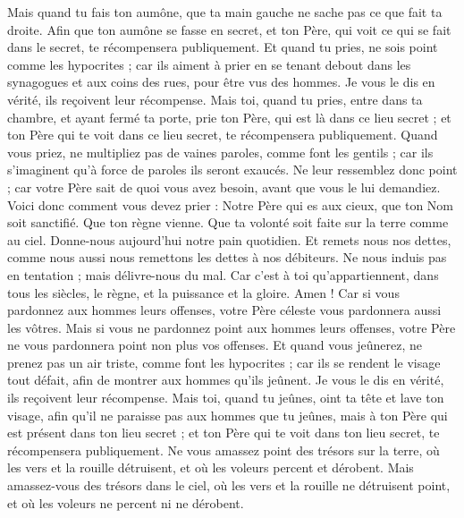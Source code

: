\begin{multicols}{2}
Mais quand tu fais ton aumône, que ta main gauche ne sache pas ce que fait ta droite.
Afin que ton aumône se fasse en secret, et ton Père, qui voit ce qui se fait dans le secret, te récompensera publiquement.
Et quand tu pries, ne sois point comme les hypocrites ; car ils aiment à prier en se tenant debout dans les synagogues et aux coins des rues, pour être vus des hommes. Je vous le dis en vérité, ils reçoivent leur récompense.
Mais toi, quand tu pries, entre dans ta chambre, et ayant fermé ta porte, prie ton Père, qui est là dans ce lieu secret ; et ton Père qui te voit dans ce lieu secret, te récompensera publiquement.
Quand vous priez, ne multipliez pas de vaines paroles, comme font les gentils ; car ils s'imaginent qu'à force de paroles ils seront exaucés.
Ne leur ressemblez donc point ; car votre Père sait de quoi vous avez besoin, avant que vous le lui demandiez.
Voici donc comment vous devez prier : Notre Père qui es aux cieux, que ton Nom soit sanctifié.
Que ton règne vienne. Que ta volonté soit faite sur la terre comme au ciel.
Donne-nous aujourd'hui notre pain quotidien.
Et remets nous nos dettes, comme nous aussi nous remettons les dettes à nos débiteurs.
Ne nous induis pas en tentation ; mais délivre-nous du mal. Car c'est à toi qu'appartiennent, dans tous les siècles, le règne, et la puissance et la gloire. Amen !
Car si vous pardonnez aux hommes leurs offenses, votre Père céleste vous pardonnera aussi les vôtres.
Mais si vous ne pardonnez point aux hommes leurs offenses, votre Père ne vous pardonnera point non plus vos offenses.
Et quand vous jeûnerez, ne prenez pas un air triste, comme font les hypocrites ; car ils se rendent le visage tout défait, afin de montrer aux hommes qu'ils jeûnent. Je vous le dis en vérité, ils reçoivent leur récompense.
Mais toi, quand tu jeûnes, oint ta tête et lave ton visage,
afin qu'il ne paraisse pas aux hommes que tu jeûnes, mais à ton Père qui est présent dans ton lieu secret ; et ton Père qui te voit dans ton lieu secret, te récompensera publiquement.
Ne vous amassez point des trésors sur la terre, où les vers et la rouille détruisent, et où les voleurs percent et dérobent.
Mais amassez-vous des trésors dans le ciel, où les vers et la rouille ne détruisent point, et où les voleurs ne percent ni ne dérobent.

\end{multicols}
